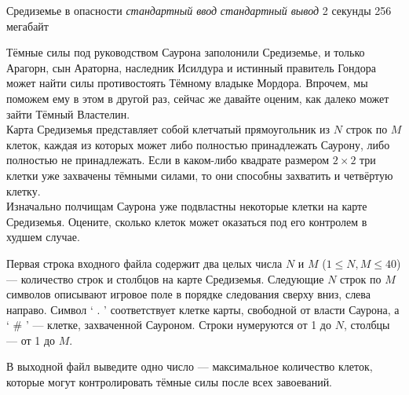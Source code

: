 \begin{problem}%
{Средиземье в опасности}%
{\textsl{стандартный ввод}}%
{\textsl{стандартный вывод}}%
{2 секунды}%
{256 мегабайт}{}

Тёмные силы под руководством Саурона заполонили Средиземье, и только Арагорн, сын Араторна, наследник Исилдура и истинный правитель Гондора может найти силы противостоять Тёмному владыке Мордора. Впрочем, мы поможем ему в этом в другой раз, сейчас же давайте оценим, как далеко может зайти Тёмный Властелин.\\

Карта Средиземья представляет собой клетчатый прямоугольник из $N$ строк по $M$ клеток, каждая из которых может либо полностью принадлежать Саурону, либо полностью не принадлежать. Если в каком-либо квадрате размером $2 \times 2$ три клетки уже захвачены тёмными силами, то они способны захватить и четвёртую клетку.\\

Изначально полчищам Саурона уже подвластны некоторые клетки на карте Средиземья. Оцените, сколько клеток может оказаться под его контролем в худшем случае.

\InputFile

Первая строка входного файла содержит два целых числа $N$ и $M$ ($1 \le N, M \le 40$) — количество строк и столбцов на карте Средиземья. Следующие $N$ строк по $M$ символов описывают игровое поле в порядке следования сверху вниз, слева направо. Символ ‘ . ’ соответствует клетке карты, свободной от власти Саурона, а ‘ \# ’ — клетке, захваченной Сауроном. Строки нумеруются от 1 до $N$, столбцы — от 1 до $M$.

\OutputFile

В выходной файл выведите одно число — максимальное количество клеток, которые могут контролировать тёмные силы после всех завоеваний.

\Examples

\begin{example}
%
%
%
\end{example}
\end{problem}